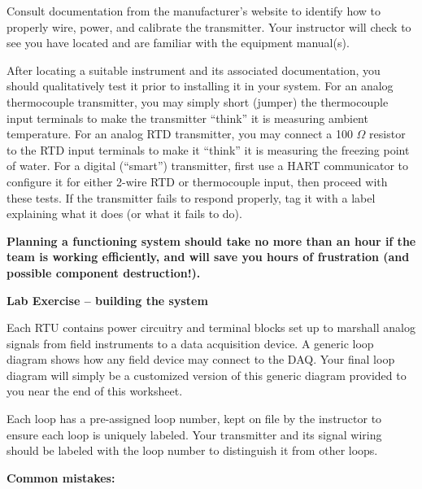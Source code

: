 \documentclass[12pt,a4paper]{article}
\begin{document}
\begin{itemize}
Consult documentation from the manufacturer's website to identify how to properly wire, power, and calibrate the transmitter.  Your instructor will check to see you have located and are familiar with the equipment manual(s).

After locating a suitable instrument and its associated documentation, you should qualitatively test it prior to installing it in your system.  For an analog thermocouple transmitter, you may simply short (jumper) the thermocouple input terminals to make the transmitter ``think'' it is measuring ambient temperature.  For an analog RTD transmitter, you may connect a 100 $\Omega$ resistor to the RTD input terminals to make it ``think'' it is measuring the freezing point of water.  For a digital (``smart'') transmitter, first use a HART communicator to configure it for either 2-wire RTD or thermocouple input, then proceed with these tests.  If the transmitter fails to respond properly, tag it with a label explaining what it does (or what it fails to do).

\vskip 10pt

{\bf Planning a functioning system should take no more than an hour if the team is working efficiently, and will save you hours of frustration (and possible component destruction!).}









\vfil \eject

\noindent
{\bf Lab Exercise -- building the system}

\vskip 5pt

Each RTU contains power circuitry and terminal blocks set up to marshall analog signals from field instruments to a data acquisition device.  A generic loop diagram shows how any field device may connect to the DAQ.  Your final loop diagram will simply be a customized version of this generic diagram provided to you near the end of this worksheet.

Each loop has a pre-assigned loop number, kept on file by the instructor to ensure each loop is uniquely labeled.  Your transmitter and its signal wiring should be labeled with the loop number to distinguish it from other loops.

\vskip 10pt

{\bf Common mistakes:}


\end{itemize}
\end{document}
